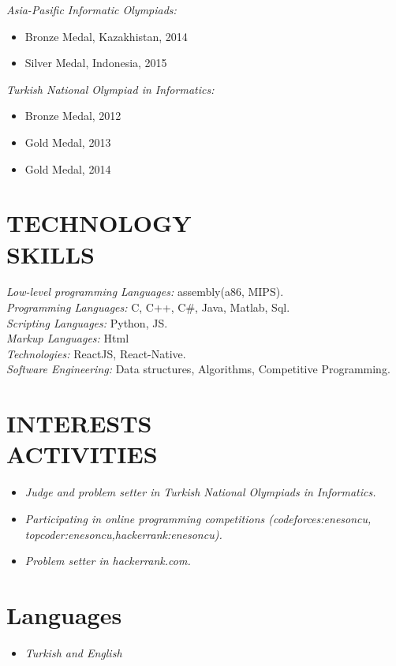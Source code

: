 \documentclass[margin, 10pt]{res} %
\begin{document}
\begin{resume}
{\sl Asia-Pasific Informatic Olympiads:}
\begin{itemize}
	\item Bronze Medal, Kazakhistan, 2014
    \item Silver Medal, Indonesia, 2015
\end{itemize}

{\sl Turkish National Olympiad in Informatics:}
\begin{itemize}
	\item Bronze Medal, 2012
    \item Gold Medal, 2013
    \item Gold Medal, 2014
\end{itemize}

\section{TECHNOLOGY \\ SKILLS} 

{\sl Low-level programming Languages:} assembly(a86, MIPS). \\
{\sl Programming Languages:} C, C++, C#, Java, Matlab, Sql. \\
{\sl Scripting Languages:} Python, JS. \\
{\sl Markup Languages:} Html \\
{\sl Technologies:} ReactJS, React-Native. \\
{\sl Software Engineering:} Data structures, Algorithms, Competitive Programming. 

\section{INTERESTS \\ ACTIVITIES}
\begin{itemize}
  \item {\sl Judge and problem setter in Turkish National Olympiads in Informatics.}
  \item {\sl Participating in online programming competitions (codeforces:enesoncu, topcoder:enesoncu,hackerrank:enesoncu).}
  \item {\sl Problem setter in hackerrank.com.}
\end{itemize}

\section{Languages}
\begin{itemize}
	\item{\sl Turkish and English}
\end{itemize}

\end{resume}
\end{document}
